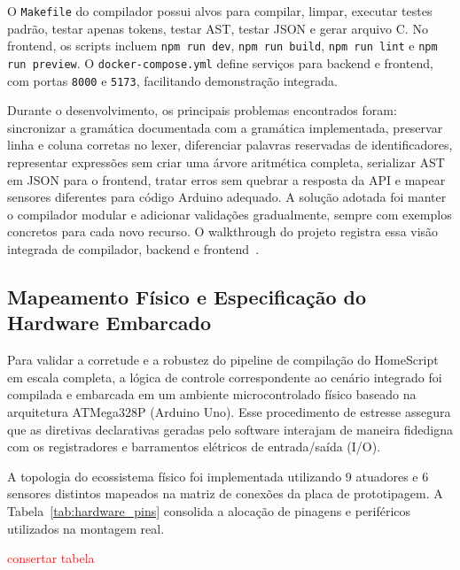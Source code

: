 \documentclass[conference]{IEEEtran}
\begin{document}
O \texttt{Makefile} do compilador possui alvos para compilar, limpar, executar testes padrão, testar apenas tokens, testar AST, testar JSON e gerar arquivo C. No frontend, os scripts incluem \texttt{npm run dev}, \texttt{npm run build}, \texttt{npm run lint} e \texttt{npm run preview}. O \texttt{docker-compose.yml} define serviços para backend e frontend, com portas \texttt{8000} e \texttt{5173}, facilitando demonstração integrada.

Durante o desenvolvimento, os principais problemas encontrados foram: sincronizar a gramática documentada com a gramática implementada, preservar linha e coluna corretas no lexer, diferenciar palavras reservadas de identificadores, representar expressões sem criar uma árvore aritmética completa, serializar AST em JSON para o frontend, tratar erros sem quebrar a resposta da API e mapear sensores diferentes para código Arduino adequado. A solução adotada foi manter o compilador modular e adicionar validações gradualmente, sempre com exemplos concretos para cada novo recurso. O walkthrough do projeto registra essa visão integrada de compilador, backend e frontend~\cite{docs-project}.

\subsection{Mapeamento Físico e Especificação do Hardware Embarcado}

Para validar a corretude e a robustez do pipeline de compilação do HomeScript em escala completa, a lógica de controle correspondente ao cenário integrado foi compilada e embarcada em um ambiente microcontrolado físico baseado na arquitetura ATMega328P (Arduino Uno). Esse procedimento de estresse assegura que as diretivas declarativas geradas pelo software interajam de maneira fidedigna com os registradores e barramentos elétricos de entrada/saída (I/O). 

A topologia do ecossistema físico foi implementada utilizando 9 atuadores e 6 sensores distintos mapeados na matriz de conexões da placa de prototipagem. A Tabela~\ref{tab:hardware_pins} consolida a alocação de pinagens e periféricos utilizados na montagem real.

\textcolor{red}{consertar tabela}
\end{document}
